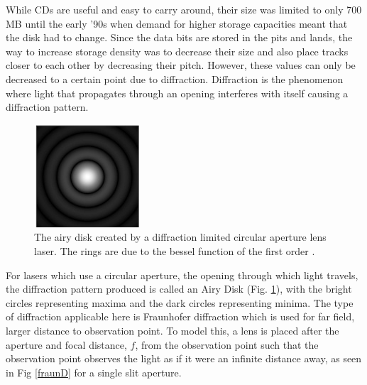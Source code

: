\documentclass[ notitlepage, numerical, 11pt]{revtex4-1} %
\begin{document}
While CDs are useful and easy to carry around, their size was limited to only 700 MB until the early '90s when demand for higher storage capacities meant that the disk had to change. Since the data bits are stored in the pits and lands, the way to increase storage density was to decrease their size and also place tracks closer to each other by decreasing their pitch. However, these values can only be decreased to a certain point due to diffraction. Diffraction is the phenomenon where light that propagates through an opening interferes with itself causing a diffraction pattern.
\begin{figure}[H]
\centerline{\includegraphics[scale=1.5]{220px-Airy-pattern.jpg}}
\caption{The airy disk created by a diffraction limited circular aperture lens laser. The rings are due to the bessel function of the first order \cite{airyDisk, optics}.}
\label{airy}
\end{figure} 
For lasers which use a circular aperture, the opening through which light travels, the diffraction pattern produced is called an Airy Disk (Fig. \ref{airy}), with the bright circles representing maxima and the dark circles representing minima. The type of diffraction applicable here is Fraunhofer diffraction which is used for far field, larger distance to observation point. To model this, a lens is placed after the aperture and focal distance, $f$, from the observation point such that the observation point observes the light as if it were an infinite distance away, as seen in Fig \ref{fraunD} for a single slit aperture.
\end{document}
